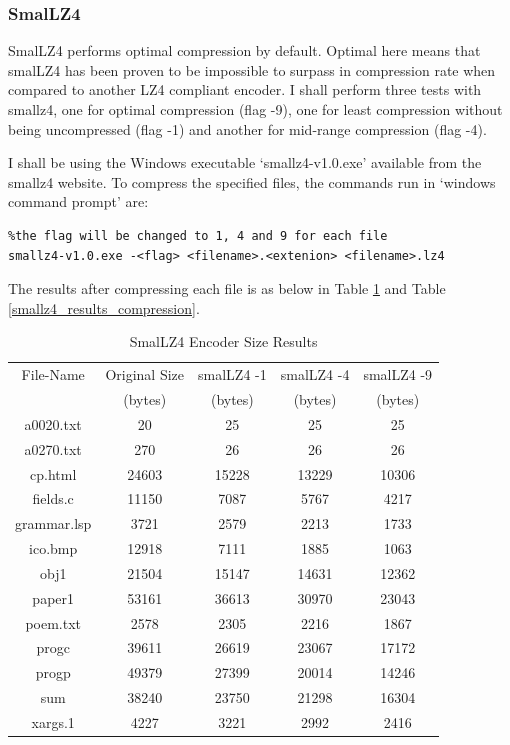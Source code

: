 \documentclass[12pt]{article}
\begin{document}
\subsubsection{SmalLZ4}
SmalLZ4 performs optimal compression by default. Optimal here means that smalLZ4 has been proven to be impossible to surpass in compression rate when compared to another LZ4 compliant encoder. I shall perform three tests with smallz4, one for optimal compression (flag -9), one for least compression without being uncompressed (flag -1) and another for mid-range compression (flag -4).

I shall be using the Windows executable `smallz4-v1.0.exe' available from the smallz4 website. To compress the specified files, the commands run in `windows command prompt' are:

\begin{verbatim}
%the flag will be changed to 1, 4 and 9 for each file
smallz4-v1.0.exe -<flag> <filename>.<extenion> <filename>.lz4
\end{verbatim}

The results after compressing each file is as 
below in Table \ref{smallz4_results_size} and Table \ref{smallz4_results_compression}.

\begin{table}[H]
	\centering
	\begin{tabular}{| c | c | c | c | c |} 
		\hline
		File-Name & Original Size & smalLZ4 -1 & smalLZ4 -4 & smalLZ4 -9 \\
		& (bytes) & (bytes) & (bytes) & (bytes) \\
		\hline
		a0020.txt & 20 & 25 & 25 & 25\\
		\hline
		a0270.txt & 270 & 26 & 26 & 26\\
		\hline
		cp.html & 24603 & 15228 & 13229 & 10306\\
		\hline
		fields.c & 11150 & 7087 & 5767 & 4217\\
		\hline
		grammar.lsp & 3721 & 2579 & 2213 & 1733\\
		\hline
		ico.bmp & 12918 & 7111 & 1885 & 1063\\
		\hline
		obj1 & 21504 & 15147 & 14631 & 12362\\
		\hline
		paper1 & 53161 & 36613 & 30970 & 23043\\
		\hline
		poem.txt & 2578 & 2305 & 2216 & 1867\\
		\hline
		progc & 39611 & 26619 & 23067 & 17172\\
		\hline
		progp & 49379 & 27399 & 20014 & 14246\\
		\hline
		sum & 38240 & 23750 & 21298 & 16304\\
		\hline
		xargs.1 & 4227 & 3221 & 2992 & 2416\\
		\hline
	\end{tabular}
	\caption{SmalLZ4 Encoder Size Results}
	\label{smallz4_results_size}
\end{table}
\end{document}
